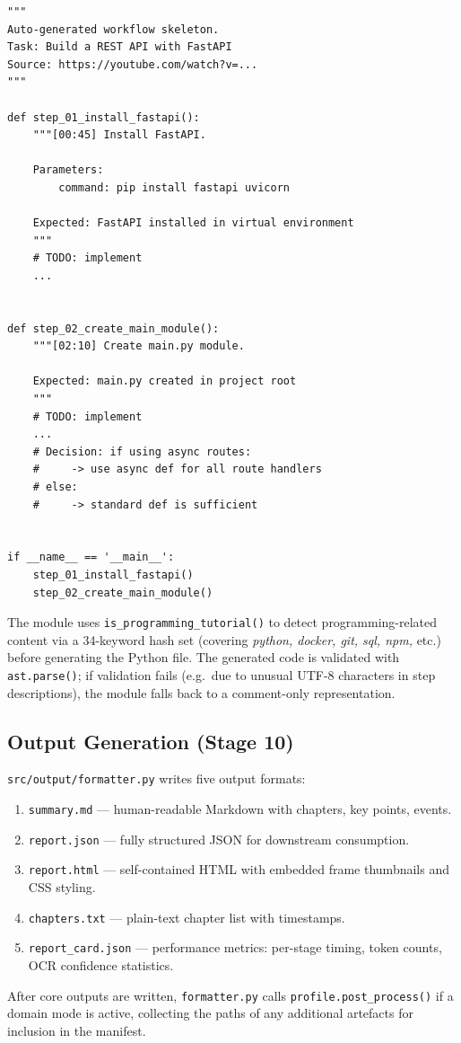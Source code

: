 \documentclass[12pt,a4paper]{article}
\begin{document}
\begin{lstlisting}[style=python, caption={Auto-generated Python skeleton from a programming tutorial (abridged).}]
"""
Auto-generated workflow skeleton.
Task: Build a REST API with FastAPI
Source: https://youtube.com/watch?v=...
"""

def step_01_install_fastapi():
    """[00:45] Install FastAPI.

    Parameters:
        command: pip install fastapi uvicorn

    Expected: FastAPI installed in virtual environment
    """
    # TODO: implement
    ...


def step_02_create_main_module():
    """[02:10] Create main.py module.

    Expected: main.py created in project root
    """
    # TODO: implement
    ...
    # Decision: if using async routes:
    #     -> use async def for all route handlers
    # else:
    #     -> standard def is sufficient


if __name__ == '__main__':
    step_01_install_fastapi()
    step_02_create_main_module()
\end{lstlisting}

The module uses \texttt{is\_programming\_tutorial()} to detect programming-related
content via a 34-keyword hash set (covering \textit{python, docker, git, sql, npm,}
etc.) before generating the Python file. The generated code is validated with
\texttt{ast.parse()}; if validation fails (e.g.\ due to unusual UTF-8 characters in
step descriptions), the module falls back to a comment-only representation.

\subsection{Output Generation (Stage 10)}
\label{subsec:output}

\texttt{src/output/formatter.py} writes five output formats:
\begin{enumerate}[leftmargin=*]
  \item \texttt{summary.md} — human-readable Markdown with chapters, key points, events.
  \item \texttt{report.json} — fully structured JSON for downstream consumption.
  \item \texttt{report.html} — self-contained HTML with embedded frame thumbnails and
    CSS styling.
  \item \texttt{chapters.txt} — plain-text chapter list with timestamps.
  \item \texttt{report\_card.json} — performance metrics: per-stage timing, token counts,
    OCR confidence statistics.
\end{enumerate}
After core outputs are written, \texttt{formatter.py} calls
\texttt{profile.post\_process()} if a domain mode is active, collecting the paths of
any additional artefacts for inclusion in the manifest.
\end{document}
